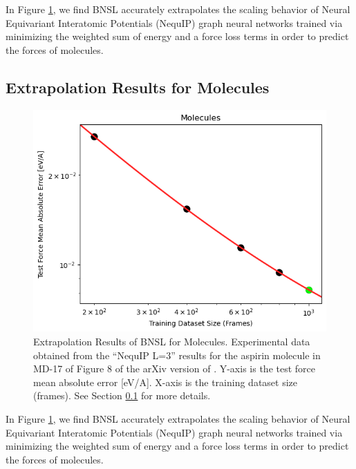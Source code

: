 \documentclass{article} %
\begin{document}
In Figure \ref{fig:molecules}, we find BNSL accurately extrapolates the scaling behavior of Neural Equivariant Interatomic Potentials (NequIP) graph neural networks \citep{Batzner_2022} trained via minimizing the weighted sum of energy and a force loss terms in order to predict the forces of molecules. 
\fi

\clearpage

\subsection{Extrapolation Results for Molecules}
\label{section:molecules}

\begin{figure}[htbp]
    \centering
\includegraphics[width=1.0\textwidth]{figures/molecules/molecules.png}
    \caption{
Extrapolation Results of BNSL for Molecules. Experimental data obtained from the ``NequIP L=3'' results for the aspirin molecule in MD-17 of Figure 8 of the arXiv version of \cite{Batzner_2022}. Y-axis is the test force mean absolute error [eV/A]. X-axis is the training dataset size (frames). See Section \ref{section:molecules} for more details.
    }
    \label{fig:molecules}
\end{figure}

In Figure \ref{fig:molecules}, we find BNSL accurately extrapolates the scaling behavior of Neural Equivariant Interatomic Potentials (NequIP) graph neural networks \citep{Batzner_2022} trained via minimizing the weighted sum of energy and a force loss terms in order to predict the forces of molecules. 
\end{document}
